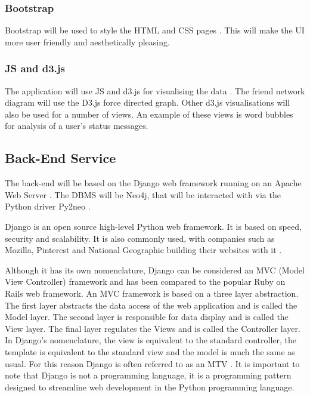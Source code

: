 \documentclass[12pt,onecolumn]{article}
\begin{document}
	\subsubsection*{Bootstrap}
	Bootstrap will be used to style the HTML and CSS pages \cite{Bootstrap}. This will make the UI more user friendly and aesthetically pleasing.
	
	\subsubsection*{JS and d3.js}
	The application will use JS and d3.js for visualising the data \cite{D3}. The friend network diagram will use the D3.js force directed graph. Other d3.js visualisations will also be used for a number of views. An example of these views is word bubbles for analysis of a user's status messages.
	
	\subsection{Back-End Service} \label{backsec}
	
	The back-end will be based on the Django web framework running on an Apache Web Server \cite{django, apache}. The DBMS will be Neo4j, that will be interacted with via the Python driver Py2neo \cite{neo4j,py2neo}. 
	
	
	Django is an open source high-level Python web framework. It is based on speed, security and scalability. It is also commonly used, with companies such as Mozilla, Pinterest and National Geographic building their websites with it \cite{django}. 
	
	Although it has its own nomenclature, Django can be considered an MVC (Model View Controller) framework and has been compared to the popular Ruby on Rails web framework. An MVC framework is based on a three layer abstraction. The first layer abstracts the data access of the web application and is called the Model layer. The second layer is responsible for data display and is called the View layer. The final layer regulates the Views and is called the Controller layer. In Django's nomenclature, the view is equivalent to the standard controller, the template is equivalent to the standard view and the model is much the same as usual. For this reason Django is often referred to as an MTV \cite{djangobook}. It is important to note that Django is not a programming language, it is a programming pattern designed to streamline web development in the Python programming language.
	
\end{document}
